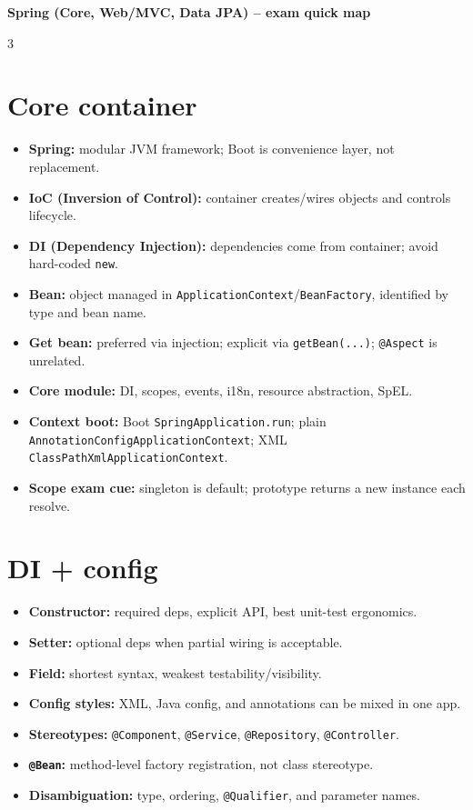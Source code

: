 {\centering\bfseries Spring (Core, Web/MVC, Data JPA) -- exam quick map\par}
\vspace{0.35ex}
\begin{multicols}{3}
\raggedright
\small

\section*{Core container}
\begin{itemize}[leftmargin=*, nosep, topsep=0pt]
  \item \textbf{Spring:} modular JVM framework; Boot is convenience layer, not replacement.
  \item \textbf{IoC (\textbf{I}nversion of \textbf{C}ontrol):} container creates/wires objects and controls lifecycle.
  \item \textbf{DI (\textbf{D}ependency \textbf{I}njection):} dependencies come from container; avoid hard-coded \texttt{new}.
  \item \textbf{Bean:} object managed in \texttt{ApplicationContext}/\texttt{BeanFactory}, identified by type and bean name.
  \item \textbf{Get bean:} preferred via injection; explicit via \texttt{getBean(...)}; \texttt{@Aspect} is unrelated.
  \item \textbf{Core module:} DI, scopes, events, i18n, resource abstraction, SpEL.
  \item \textbf{Context boot:} Boot \texttt{SpringApplication.run}; plain \texttt{AnnotationConfigApplicationContext}; XML \texttt{ClassPathXmlApplicationContext}.
  \item \textbf{Scope exam cue:} singleton is default; prototype returns a new instance each resolve.
\end{itemize}

\section*{DI + config}
\begin{itemize}[leftmargin=*, nosep, topsep=0pt]
  \item \textbf{Constructor:} required deps, explicit API, best unit-test ergonomics.
  \item \textbf{Setter:} optional deps when partial wiring is acceptable.
  \item \textbf{Field:} shortest syntax, weakest testability/visibility.
  \item \textbf{Config styles:} XML, Java config, and annotations can be mixed in one app.
  \item \textbf{Stereotypes:} \texttt{@Component}, \texttt{@Service}, \texttt{@Repository}, \texttt{@Controller}.
  \item \textbf{\texttt{@Bean}:} method-level factory registration, not class stereotype.
  \item \textbf{Disambiguation:} type, ordering, \texttt{@Qualifier}, and parameter names.
\end{itemize}


\end{multicols}
